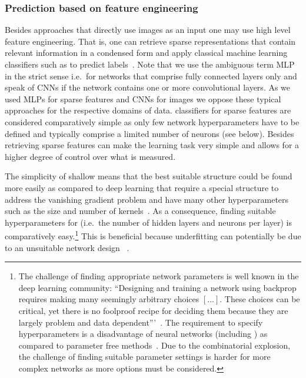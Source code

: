 \subsubsection{Prediction based on feature engineering}
\label{subsec:FeatureEngineering}

Besides approaches that directly use images as an input one may use high level feature engineering. That is, one can retrieve sparse representations that contain relevant information in a condensed form and apply classical machine learning classifiers such as  to predict labels~\citep{zheng2018feature}. Note that we use the ambiguous term MLP in the strict sense i.e.\ for networks that comprise fully connected layers only and speak of CNNs if the network contains one or more convolutional layers. As we used MLPs for sparse features and CNNs for images we oppose these typical approaches for the respective domains of data.   classifiers for sparse features are considered comparatively simple as only few network hyperparameters have to be defined and typically comprise a limited number of neurons (see below). Besides retrieving sparse features can make the learning task very simple and allows for a higher degree of control over what is measured.

The simplicity of shallow  means that the best suitable structure could be found more easily as compared to deep learning  that require a special structure to address the vanishing gradient problem and have many other hyperparameters such as the size and number of kernels~\citep{wang2019vanishing}.  As a consequence, finding suitable hyperparameters for  (i.e.\ the number of hidden layers and neurons per layer) is comparatively easy.\footnote{The challenge of finding appropriate network parameters is well known in the deep learning community: \enquote{Designing and training a network using backprop requires making many seemingly arbitrary choices $[...]$. These choices can be critical, yet there is no foolproof recipe for deciding them because they are largely problem and data dependent}’~\citep[p.~9]{lecun2012efficient}. The requirement to specify hyperparameters is a disadvantage of neural networks (including ) as compared to parameter free methods~\citep{scikit2019neural}. Due to the combinatorial explosion, the challenge of finding suitable parameter settings is harder for more complex networks as more options must be considered.} This is beneficial because underfitting can potentially be due to an unsuitable network design ~\citep{lecun2012efficient}. 

